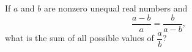 If $a$ and $b$ are nonzero unequal real numbers and
\[
\dfrac{a-b}{a}=\dfrac{b}{a-b},
\]
what is the sum of all possible values of $\dfrac {a}{b}$?
